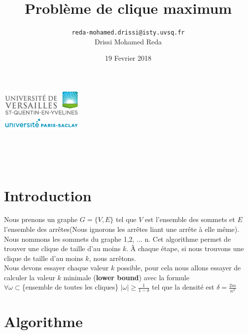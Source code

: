 \documentclass{article}
\title{\Huge Problème de clique maximum}
\author{\texttt{reda-mohamed.drissi@isty.uvsq.fr}\\
        Drissi Mohamed Reda}
\date{19 Fevrier 2018}
\begin{document}
\makeatletter
    \begin{titlepage}
        \begin{center}
        	\includegraphics[width=40mm]{Report/uvsq-header.png}\par \vspace{1cm}
            {\@title }\\[4ex]
            {\@author}\\[4ex]
            {\@date} \\ [4ex]
        \end{center}
    \end{titlepage}
\makeatother
\thispagestyle{empty}
\newpage
\tableofcontents
\newpage
\section{Introduction}
Nous prenons un graphe $G=\{V,E\}$ tel que $V$ est l'ensemble des sommets
et $E$ l'ensemble des arrêtes(Nous ignorons les arrêtes liant une arrête à elle même). \\
Nous nommons les sommets du graphe 1,2, ... n. Cet algorithme permet de trouver une clique
de taille d'au moins $k$. À chaque étape, si nous trouvons une clique de taille d'au moins
$k$, nous arrêtons.\\
Nous devons essayer chaque valeur $k$ possible, pour cela nous allons essayer de calculer la valeur
$k$ minimale (\textbf{lower bound}) avec la formule \\
$\forall \omega \subset $\{ensemble de toutes les cliques\} $|\omega| \geq \frac{1}{1-\delta}$
tel que la densité est $\delta=\frac{2m}{n^2}$
\section{Algorithme}
\end{document}
